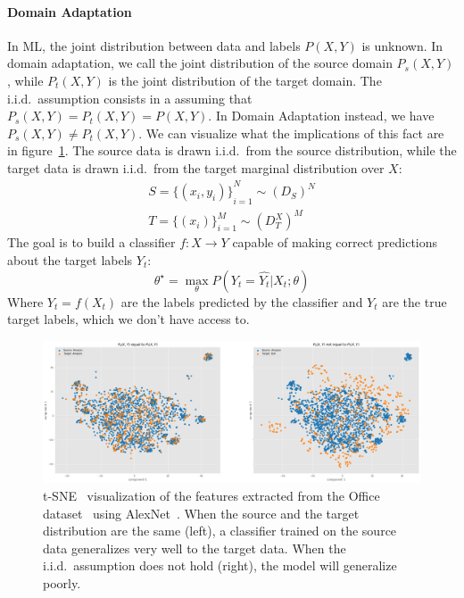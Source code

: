 \documentclass[../main.tex]{subfiles}
\begin{document}
    \paragraph{Domain Adaptation}
    In ML, the joint distribution between data and labels $P(X, Y)$ is unknown. In domain adaptation,
    we call the joint distribution of the source domain $ P_{s}(X, Y) $, while $ P_{t}(X, Y) $ is the joint distribution of
    the target domain. The i.i.d.\ assumption consists in a assuming that $ P_{s}(X, Y) = P_{t}(X, Y) = P(X, Y) $.
    In Domain Adaptation instead, we have $ P_{s}(X, Y) \neq P_{t}(X, Y) $. We can visualize what the implications
    of this fact are in figure~\ref{fig:AD-tsne}.
    \newline
    The source data is drawn i.i.d.\ from the source distribution, while the target data is drawn i.i.d.\ from the target marginal
    distribution over $X$:
    \begin{align*}
        S = {\{(x_{i}, y_{i})\}}_{i=1}^{N} \sim {(D_{S})}^{N} \\
        T = {\{(x_{i})\}}_{i=1}^{M} \sim {(D_{T}^{X})}^{M}
    \end{align*}
    The goal is to build a classifier $f : X \rightarrow Y$ capable of making correct predictions about the target labels $Y_{t}$:
    $$ \theta^{\star} = \max_{\theta} P(Y_{t} = \hat{Y_{t}} | X_{t} ; \theta) $$
    Where $\hat{Y_{t}} = f(X_{t})$ are the labels predicted by the classifier and $Y_{t}$ are the true target labels, which we
    don't have access to.

    \begin{figure}
        \centering{}
    	\includegraphics[width=\linewidth]{img/AD-alexnet-tsne.png}
        \caption{t-SNE~\cite{tsne} visualization of the features extracted from the Office dataset~\cite{office} using AlexNet~\cite{alexnet}.
        When the source and the target distribution are the same (left), a classifier trained on the source data generalizes very well to the target
        data. When the i.i.d.\ assumption does not hold (right), the model will generalize poorly.}\label{fig:AD-tsne}
	\end{figure}
\end{document}
